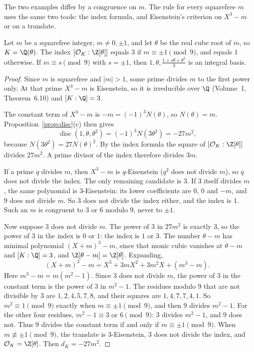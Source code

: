 The two examples differ by a congruence on $m$. The rule for every squarefree $m$ uses the same two tools: the index
formula, and Eisenstein's criterion on $X^3-m$ or on a translate.

\begin{propositionx}\label{prop:purecubic}
Let $m$ be a squarefree integer, $m\ne0,\pm1$, and let $\theta$ be the real cube root of $m$, so $K=\Q(\theta)$. The
index $[\mathcal O_K:\Z[\theta]]$ equals $3$ if $m\equiv\pm1\pmod9$, and equals $1$ otherwise. If $m\equiv s\pmod9$
with $s=\pm1$, then $1,\theta,\frac{1+s\theta+\theta^2}3$ is an integral basis.
\end{propositionx}
\begin{proof}
Since $m$ is squarefree and $|m|>1$, some prime divides $m$ to the first power only. At that prime $X^3-m$ is
Eisenstein, so it is irreducible over $\Q$ (Volume~1, Theorem~6.10) and $[K:\Q]=3$.

The constant term of $X^3-m$ is $-m=(-1)^3N(\theta)$, so $N(\theta)=m$. Proposition~\ref{prop:disc}(c) then gives
\[
\operatorname{disc}(1,\theta,\theta^2)=(-1)^{3}N(3\theta^2)=-27m^2,
\]
because $N(3\theta^2)=27N(\theta)^2$. By the index formula the square of $[\mathcal O_K:\Z[\theta]]$ divides $27m^2$.
A prime divisor of the index therefore divides $3m$.

If a prime $q$ divides $m$, then $X^3-m$ is $q$-Eisenstein ($q^2$ does not divide $m$), so $q$ does not divide the
index. The only remaining candidate is $3$. If $3$ itself divides $m$, the same polynomial is $3$-Eisenstein: its
lower coefficients are $0$, $0$ and $-m$, and $9$ does not divide $m$. So $3$ does not divide the index either, and
the index is $1$. Such an $m$ is congruent to $3$ or $6$ modulo $9$, never to $\pm1$.

Now suppose $3$ does not divide $m$. The power of $3$ in $27m^2$ is exactly $3$, so the power of $3$ in the index is
$0$ or $1$: the index is $1$ or $3$. The number $\theta-m$ has minimal polynomial $(X+m)^3-m$, since that monic
cubic vanishes at $\theta-m$ and $[K:\Q]=3$, and $\Z[\theta-m]=\Z[\theta]$. Expanding,
\[
(X+m)^3-m=X^3+3mX^2+3m^2X+(m^3-m).
\]
Here $m^3-m=m(m^2-1)$. Since $3$ does not divide $m$, the power of $3$ in the constant term is the power of $3$ in
$m^2-1$. The residues modulo $9$ that are not divisible by $3$ are $1,2,4,5,7,8$, and their squares are
$1,4,7,7,4,1$. So $m^2\equiv1\pmod9$ exactly when $m\equiv\pm1\pmod9$, and then $9$ divides $m^2-1$. For the other
four residues, $m^2-1\equiv3$ or $6\pmod9$: $3$ divides $m^2-1$, and $9$ does not. Thus $9$ divides the constant
term if and only if $m\equiv\pm1\pmod9$. When $m\not\equiv\pm1\pmod9$, the translate is $3$-Eisenstein, $3$ does not
divide the index, and $\mathcal O_K=\Z[\theta]$. Then $d_K=-27m^2$.


\end{proof}
